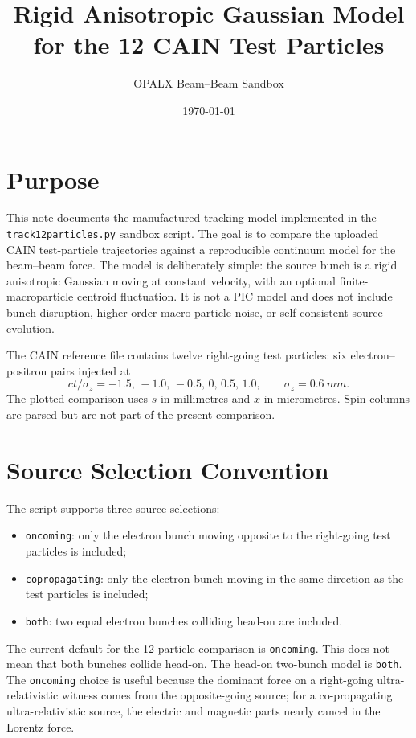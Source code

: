 \documentclass[11pt]{article}
\title{Rigid Anisotropic Gaussian Model for the 12 CAIN Test Particles}
\author{OPALX Beam--Beam Sandbox}
\date{\today}
\begin{document}
\maketitle

\section{Purpose}

This note documents the manufactured tracking model implemented in the
\texttt{track12particles.py} sandbox script.  The goal is to compare the
uploaded CAIN test-particle trajectories against a reproducible continuum model
for the beam--beam force.  The model is deliberately simple: the source bunch
is a rigid anisotropic Gaussian moving at constant velocity, with an optional
finite-macroparticle centroid fluctuation.  It is not a PIC model and does not
include bunch disruption, higher-order macro-particle noise, or
self-consistent source evolution.

The CAIN reference file contains twelve right-going test particles:
six electron--positron pairs injected at
\[
  ct/\sigma_z = -1.5,\,-1.0,\,-0.5,\,0,\,0.5,\,1.0,
  \qquad \sigma_z = \SI{0.6}{mm}.
\]
The plotted comparison uses \(s\) in millimetres and \(x\) in micrometres.
Spin columns are parsed but are not part of the present comparison.

\section{Source Selection Convention}

The script supports three source selections:
\begin{itemize}
  \item \texttt{oncoming}: only the electron bunch moving opposite to the
        right-going test particles is included;
  \item \texttt{copropagating}: only the electron bunch moving in the same
        direction as the test particles is included;
  \item \texttt{both}: two equal electron bunches colliding head-on are
        included.
\end{itemize}
The current default for the 12-particle comparison is \texttt{oncoming}.  This
does not mean that both bunches collide head-on.  The head-on two-bunch model is
\texttt{both}.  The \texttt{oncoming} choice is useful because the dominant
force on a right-going ultra-relativistic witness comes from the opposite-going
source; for a co-propagating ultra-relativistic source, the electric and
magnetic parts nearly cancel in the Lorentz force.
\end{document}
